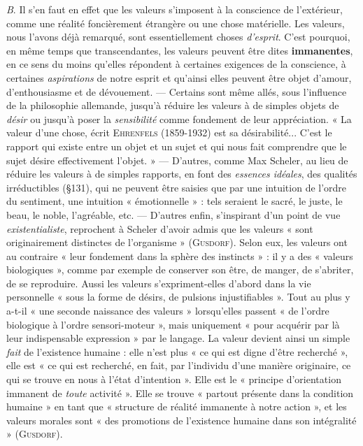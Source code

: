 {\it B}. Il s’en faut en effet que les valeurs s'imposent à la conscience
de l'extérieur, comme une réalité foncièrement étrangère ou une chose
matérielle. Les valeurs, nous l'avons déjà remarqué, sont essentiellement
choses {\it d'esprit}. C’est pourquoi, en même temps que transcendantes,
les valeurs peuvent être dites {\bf immanentes}, en ce sens du
moins qu’elles répondent à certaines exigences de la conscience, à
certaines {\it aspirations} de notre esprit et qu’ainsi elles peuvent être
objet d'amour, d'enthousiasme et de dévouement. — Certains sont
même allés, sous l'influence de la philosophie allemande, jusqu’à
réduire les valeurs à de simples objets de {\it désir} ou jusqu’à poser la {\it sensibilité}
comme fondement de leur appréciation. « La valeur d’une chose,
écrit \textsc{Ehrenfels} (1859-1932) est sa désirabilité... C'est le rapport qui
existe entre un objet et un sujet et qui nous fait comprendre que
le sujet désire effectivement l’objet. » — D'autres, comme Max
Scheler, au lieu de réduire les valeurs à de simples rapports, en
font des {\it essences idéales}, des qualités irréductibles (\S 131), qui ne
peuvent être saisies que par une intuition de l’ordre du sentiment,
une intuition « émotionnelle » : tels seraient le sacré, le juste, le
beau, le noble, l’agréable, etc. — D’autres enfin, s'inspirant d'un
point de vue {\it existentialiste}, reprochent à Scheler d’avoir admis que
les valeurs « sont originairement distinctes de l'organisme » (\textsc{Gusdorf}).
Selon eux, les valeurs ont au contraire « leur fondement
dans la sphère des instincts » : il y a des « valeurs biologiques », comme
par exemple de conserver son être, de manger, de s’abriter, de se
reproduire. Aussi les valeurs s’expriment-elles d’abord dans la vie
personnelle « sous la forme de désirs, de pulsions injustifiables ».
Tout au plus y a-t-il « une seconde naissance des valeurs » lorsqu'elles
passent « de l’ordre biologique à l’ordre sensori-moteur », mais uniquement
« pour acquérir par là leur indispensable expression » par
le langage. La valeur devient ainsi un simple {\it fait} de l'existence
humaine : elle n’est plus « ce qui est digne d’être recherché », elle est
« ce qui est recherché, en fait, par l’individu d’une manière originaire,
ce qui se trouve en nous à l’état d'intention ». Elle est le « principe
d'orientation immanent de {\it toute} activité ». Elle se trouve « partout
présente dans la condition humaine » en tant que « structure de réalité
immanente à notre action », et les valeurs morales sont « des promotions
de l'existence humaine dans son intégralité » (\textsc{Gusdorf}).


